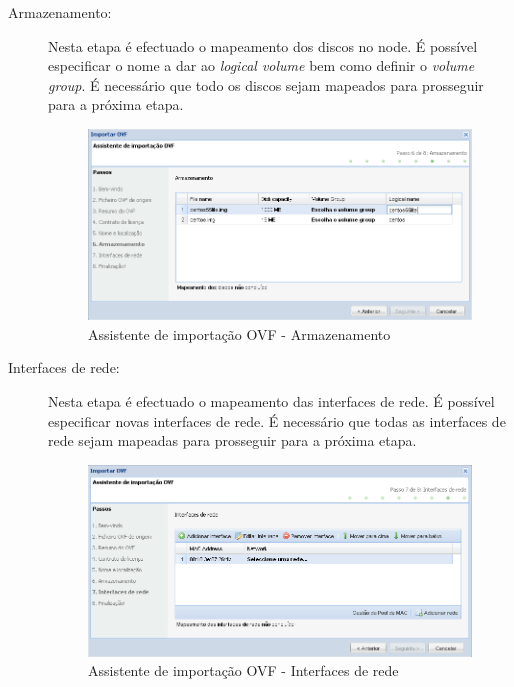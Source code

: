 \begin{description}
    \item[Armazenamento:] Nesta etapa é efectuado o mapeamento dos discos no node. É possível especificar o nome a dar ao \emph{logical volume} bem como definir o \emph{volume group}.
        É necessário que todo os discos sejam mapeados para prosseguir para a próxima etapa.
		\begin{figure}[H]
            \begin{center}
            \includegraphics[scale=0.5]{screenshots/ovf_import_storage.png}
            \caption{Assistente de importação OVF - Armazenamento}
            \label{fig:ovf_import_storage}
            \end{center}
        \end{figure}    

    \item[Interfaces de rede:] Nesta etapa é efectuado o mapeamento das interfaces de rede. É possível especificar novas interfaces de rede.
        É necessário que todas as interfaces de rede sejam mapeadas para prosseguir para a próxima etapa.
		\begin{figure}[H]
            \begin{center}
            \includegraphics[scale=0.5]{screenshots/ovf_import_networks.png}
            \caption{Assistente de importação OVF - Interfaces de rede}
            \label{fig:ovf_import_networks}
            \end{center}
        \end{figure}


\end{description}
